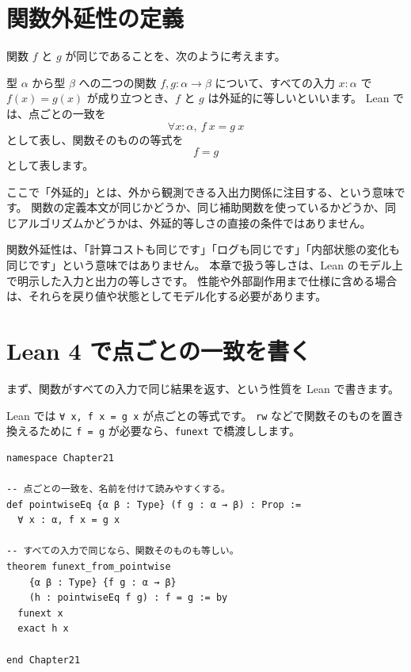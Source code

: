 \section{関数外延性の定義}

関数 \(f\) と \(g\) が同じであることを、次のように考えます。

型 \(\alpha\) から型 \(\beta\) への二つの関数 \(f, g : \alpha \to \beta\) について、すべての入力 \(x : \alpha\) で \(f(x) = g(x)\) が成り立つとき、\(f\) と \(g\) は外延的に等しいといいます。
Lean では、点ごとの一致を
\[
  \forall x : \alpha,\ f\ x = g\ x
\]
として表し、関数そのものの等式を
\[
  f = g
\]
として表します。

ここで「外延的」とは、外から観測できる入出力関係に注目する、という意味です。
関数の定義本文が同じかどうか、同じ補助関数を使っているかどうか、同じアルゴリズムかどうかは、外延的等しさの直接の条件ではありません。

関数外延性は、「計算コストも同じです」「ログも同じです」「内部状態の変化も同じです」という意味ではありません。
本章で扱う等しさは、Lean のモデル上で明示した入力と出力の等しさです。
性能や外部副作用まで仕様に含める場合は、それらを戻り値や状態としてモデル化する必要があります。

\section{Lean 4 で点ごとの一致を書く}

まず、関数がすべての入力で同じ結果を返す、という性質を Lean で書きます。

Lean では \texttt{∀ x, f x = g x} が点ごとの等式です。
\texttt{rw} などで関数そのものを置き換えるために \texttt{f = g} が必要なら、\texttt{funext} で橋渡しします。

\begin{listing}[htbp]
\begin{verbatim}
namespace Chapter21

-- 点ごとの一致を、名前を付けて読みやすくする。
def pointwiseEq {α β : Type} (f g : α → β) : Prop :=
  ∀ x : α, f x = g x

-- すべての入力で同じなら、関数そのものも等しい。
theorem funext_from_pointwise
    {α β : Type} {f g : α → β}
    (h : pointwiseEq f g) : f = g := by
  funext x
  exact h x

end Chapter21
\end{verbatim}
\caption{\texttt{funext\_from\_pointwise}}
\label{lst:ch21-pointwise-funext}
\end{listing}

